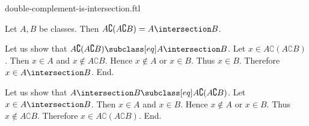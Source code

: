 \documentclass{article}
\begin{document}
\begin{smodule}[creators={Marcel Schütz}]{double-complement-is-intersection.ftl}

  \begin{fproposition*}[label=554506062397440]
    Let $A, B$ be classes.
    Then $A \complement (A \complement B) = A \intersection B$.
  \end{fproposition*}
  \begin{fproof}
    Let us show that $A \complement (A \complement B) \subclass[eq] A \intersection B$.
      Let $x \in A \complement (A \complement B)$.
      Then $x \in A$ and $x \notin A \complement B$.
      Hence $x \notin A$ or $x \in B$.
      Thus $x \in B$.
      Therefore $x \in A \intersection B$.
    End.

    Let us show that $A \intersection B \subclass[eq] A \complement (A \complement B)$.
      Let $x \in A \intersection B$.
      Then $x \in A$ and $x \in B$.
      Hence $x \notin A$ or $x \in B$.
      Thus $x \notin A \complement B$.
      Therefore $x \in A \complement (A \complement B)$.
    End.
  \end{fproof}
\end{smodule}
\end{document}
